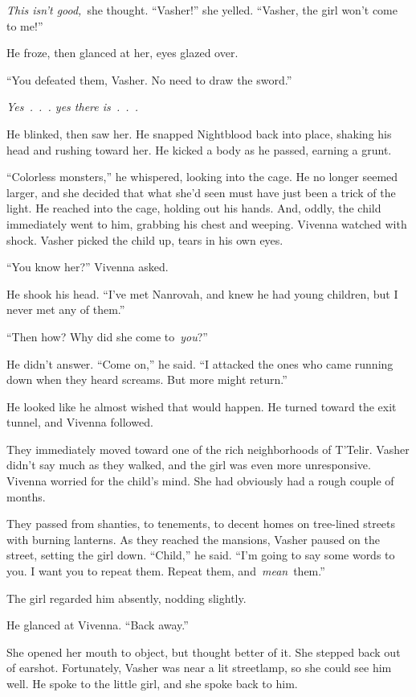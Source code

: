 \textit{This isn’t good,}~she thought. “Vasher!” she yelled. “Vasher, the girl won’t come to me!”

He froze, then glanced at her, eyes glazed over.

“You defeated them, Vasher. No need to draw the sword.”

\textit{Yes~.~.~. yes there is~.~.~.}

He blinked, then saw her. He snapped Nightblood back into place, shaking his head and rushing toward her. He kicked a body as he passed, earning a grunt.

“Colorless monsters,” he whispered, looking into the cage. He no longer seemed larger, and she decided that what she’d seen must have just been a trick of the light. He reached into the cage, holding out his hands. And, oddly, the child immediately went to him, grabbing his chest and weeping. Vivenna watched with shock. Vasher picked the child up, tears in his own eyes.

“You know her?” Vivenna asked.

He shook his head. “I’ve met Nanrovah, and knew he had young children, but I never met any of them.”

“Then how? Why did she come to~\textit{you}?”

He didn’t answer. “Come on,” he said. “I attacked the ones who came running down when they heard screams. But more might return.”

He looked like he almost wished that would happen. He turned toward the exit tunnel, and Vivenna followed.

\orn

They immediately moved toward one of the rich neighborhoods of T’Telir. Vasher didn’t say much as they walked, and the girl was even more unresponsive. Vivenna worried for the child’s mind. She had obviously had a rough couple of months.

They passed from shanties, to tenements, to decent homes on tree-lined streets with burning lanterns. As they reached the mansions, Vasher paused on the street, setting the girl down. “Child,” he said. “I’m going to say some words to you. I want you to repeat them. Repeat them, and~\textit{mean}~them.”

The girl regarded him absently, nodding slightly.

He glanced at Vivenna. “Back away.”

She opened her mouth to object, but thought better of it. She stepped back out of earshot. Fortunately, Vasher was near a lit streetlamp, so she could see him well. He spoke to the little girl, and she spoke back to him.

